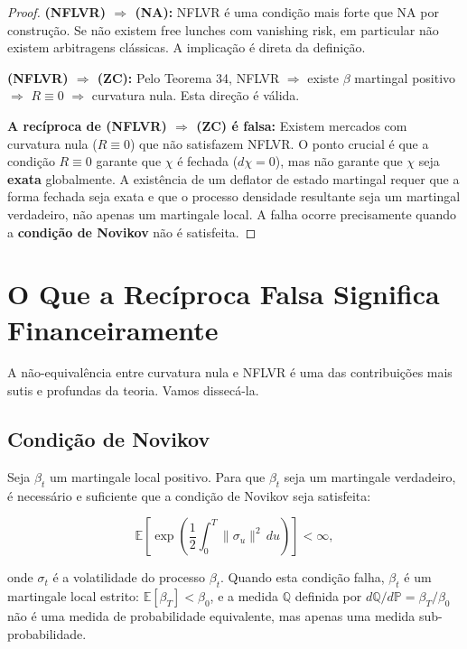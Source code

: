 \begin{proof}
\textbf{(NFLVR) $\Rightarrow$ (NA):} NFLVR \'e uma condi\c{c}\~ao mais forte que NA por constru\c{c}\~ao. Se n\~ao existem free lunches com vanishing risk, em particular n\~ao existem arbitragens cl\'assicas. A implica\c{c}\~ao \'e direta da defini\c{c}\~ao.

\textbf{(NFLVR) $\Rightarrow$ (ZC):} Pelo Teorema 34, NFLVR $\Rightarrow$ existe $\beta$ martingal positivo $\Rightarrow$ $R \equiv 0$ $\Rightarrow$ curvatura nula. Esta dire\c{c}\~ao \'e v\'alida.

\textbf{A rec\'iproca de (NFLVR) $\Rightarrow$ (ZC) \'e falsa:} Existem mercados com curvatura nula ($R \equiv 0$) que n\~ao satisfazem NFLVR. O ponto crucial \'e que a condi\c{c}\~ao $R \equiv 0$ garante que $\chi$ \'e fechada ($d\chi = 0$), mas n\~ao garante que $\chi$ seja \textbf{exata} globalmente. A exist\^encia de um deflator de estado martingal requer que a forma fechada seja exata e que o processo densidade resultante seja um martingal verdadeiro, n\~ao apenas um martingale local. A falha ocorre precisamente quando a \textbf{condi\c{c}\~ao de Novikov} n\~ao \'e satisfeita.
\end{proof}

\section{O Que a Rec\'iproca Falsa Significa Financeiramente}

A n\~ao-equival\^encia entre curvatura nula e NFLVR \'e uma das contribui\c{c}\~oes mais sutis e profundas da teoria. Vamos dissec\'a-la.

\subsection{Condi\c{c}\~ao de Novikov}

Seja $\beta_t$ um martingale local positivo. Para que $\beta_t$ seja um martingale verdadeiro, \'e necess\'ario e suficiente que a condi\c{c}\~ao de Novikov seja satisfeita:

\begin{equation}
\mathbb{E}\left[\exp\left(\frac{1}{2} \int_0^T \|\sigma_u\|^2\, du\right)\right] < \infty,
\end{equation}

onde $\sigma_t$ \'e a volatilidade do processo $\beta_t$. Quando esta condi\c{c}\~ao falha, $\beta_t$ \'e um martingale local estrito: $\mathbb{E}[\beta_T] < \beta_0$, e a medida $\mathbb{Q}$ definida por $d\mathbb{Q}/d\mathbb{P} = \beta_T / \beta_0$ n\~ao \'e uma medida de probabilidade equivalente, mas apenas uma medida sub-probabilidade.

